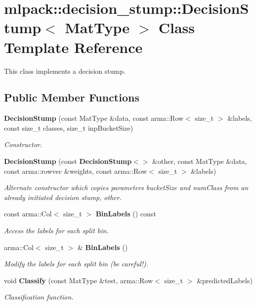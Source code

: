 \section{mlpack\-:\-:decision\-\_\-stump\-:\-:Decision\-Stump$<$ Mat\-Type $>$ Class Template Reference}
\label{classmlpack_1_1decision__stump_1_1DecisionStump}


This class implements a decision stump.  


\subsection*{Public Member Functions}
\begin{DoxyCompactItemize}
\item 
{\bf Decision\-Stump} (const Mat\-Type \&data, const arma\-::\-Row$<$ size\-\_\-t $>$ \&labels, const size\-\_\-t classes, size\-\_\-t inp\-Bucket\-Size)
\begin{DoxyCompactList}\small\item\em Constructor. \end{DoxyCompactList}\item 
{\bf Decision\-Stump} (const {\bf Decision\-Stump}$<$$>$ \&other, const Mat\-Type \&data, const arma\-::rowvec \&weights, const arma\-::\-Row$<$ size\-\_\-t $>$ \&labels)
\begin{DoxyCompactList}\small\item\em Alternate constructor which copies parameters bucket\-Size and num\-Class from an already initiated decision stump, other. \end{DoxyCompactList}\item 
const arma\-::\-Col$<$ size\-\_\-t $>$ {\bf Bin\-Labels} () const 
\begin{DoxyCompactList}\small\item\em Access the labels for each split bin. \end{DoxyCompactList}\item 
arma\-::\-Col$<$ size\-\_\-t $>$ \& {\bf Bin\-Labels} ()
\begin{DoxyCompactList}\small\item\em Modify the labels for each split bin (be careful!). \end{DoxyCompactList}\item 
void {\bf Classify} (const Mat\-Type \&test, arma\-::\-Row$<$ size\-\_\-t $>$ \&predicted\-Labels)
\begin{DoxyCompactList}\small\item\em Classification function. \end{DoxyCompactList}\item 
$$
\end{DoxyCompactItemize}
